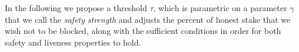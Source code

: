 %		

In the following we propose a threshold $\tau$, which is parametric on a 
parameter $\gamma$ that we call the \emph{safety strength} and adjusts the 
percent of honest stake that we wish not to be blocked, along with the 
sufficient conditions in order for both 
safety and liveness properties to hold.

